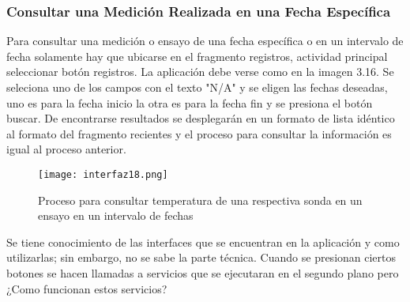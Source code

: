 \subsubsection{Consultar una Medición Realizada en una Fecha Específica}

\par 
Para consultar una medición o ensayo de una fecha específica o en un intervalo de fecha solamente hay que ubicarse en el fragmento registros, actividad principal seleccionar botón registros. La aplicación debe verse como en la imagen 3.16. Se seleciona uno de los campos con el texto "N/A" y se eligen las fechas deseadas, uno es para la fecha inicio la otra es para la fecha fin y se presiona el botón buscar. De encontrarse resultados se desplegarán en un formato de lista idéntico al formato del fragmento recientes y el proceso para consultar la información es igual al proceso anterior.

\begin{figure}[H]
	\centering
	\texttt{[image: interfaz18.png]}
	\caption{Proceso para consultar temperatura de una respectiva sonda en un ensayo en un intervalo de fechas}
\end{figure}

\par \noindent
Se tiene conocimiento de las interfaces que se encuentran en la aplicación y como utilizarlas; sin embargo, no se sabe la parte técnica. Cuando se presionan ciertos botones se hacen llamadas a servicios que se ejecutaran en el segundo plano pero ¿Como funcionan estos servicios?
